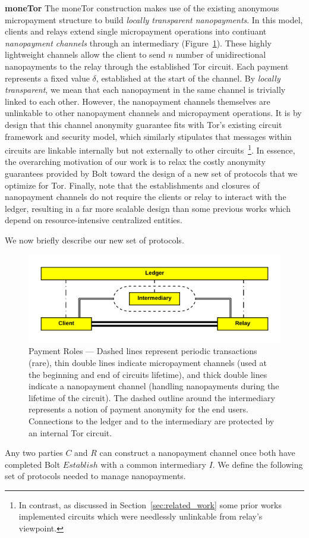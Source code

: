 \textbf{moneTor} The moneTor construction makes use of the existing anonymous
micropayment structure to build \emph{locally transparent nanopayments}. In this
model, clients and relays extend single micropayment operations into contiuant
\emph{nanopayment channels} through an intermediary (Figure~\ref{fig:parties}).
These highly lightweight channels allow the client to send $n$ number of
unidirectional nanopayments to the relay through the established Tor circuit.
Each payment represents a fixed value $\delta$, established at the start of the
channel. By \emph{locally transparent}, we mean that each nanopayment in the
same channel is trivially linked to each other. However, the nanopayment
channels themselves are unlinkable to other nanopayment channels and
micropayment operations. It is by design that this channel anonymity guarantee
fits with Tor's existing circuit framework and security model, which similarly
stipulates that messages within circuits are linkable internally but not
externally to other circuits~\footnote{In contrast, as discussed in
  Section~\ref{sec:related_work} some prior works implemented circuits which
  were needlessly unlinkable from relay's viewpoint.}. In essence, the
overarching motivation of our work is to relax the costly anonymity guarantees
provided by Bolt toward the design of a new set of protocols that we optimize
for Tor. Finally, note that the establishments and closures of nanopayment
channels do not require the clients or relay to interact with the ledger,
resulting in a far more scalable design than some previous works which depend on
resource-intensive centralized entities.

 We now briefly describe our new set of protocols.
\begin{figure}[h] \centering
  \includegraphics[trim={0.5cm, 0.5cm, 0.5cm, 0.5cm}, clip,
    scale=0.6]{images/party_diagram.png}
  \caption[Payment Roles]{Payment Roles --- Dashed lines represent periodic
    transactions (rare), thin double lines indicate micropayment channels (used
    at the beginning and end of circuits lifetime), and thick double lines
    indicate a nanopayment channel (handling nanopayments during the lifetime of
    the circuit). The dashed outline around the intermediary represents a notion
    of payment anonymity for the end users. Connections to the ledger and to the
    intermediary are protected by an internal Tor circuit.}
  \label{fig:parties}
\end{figure}
Any two parties $C$ and $R$ can construct a nanopayment channel once both have
completed Bolt $Establish$ with a common intermediary $I$. We define the
following set of protocols needed to manage nanopayments.


